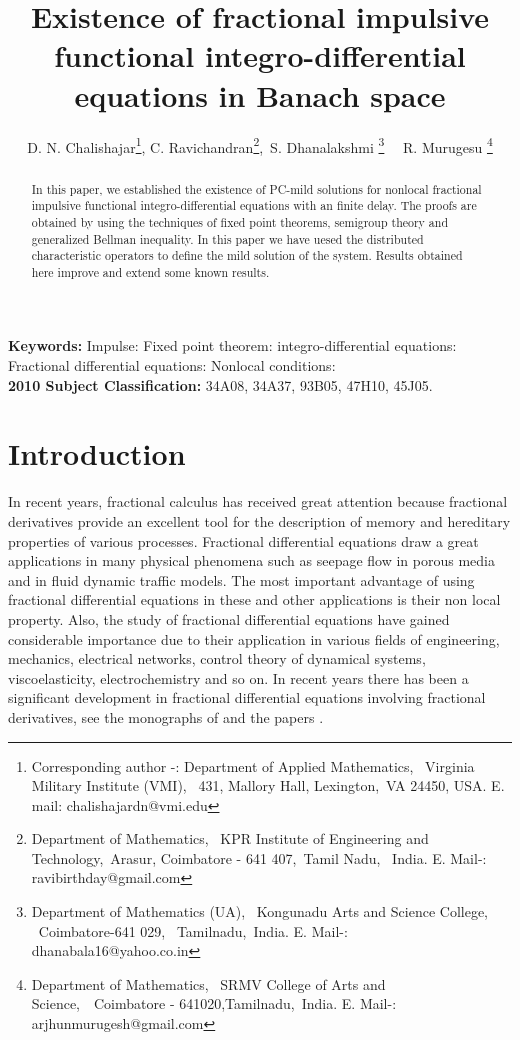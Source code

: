 \documentclass[11pt]{article}
\begin{document}
\setcounter{equation}{0}



\title{\bf Existence of fractional impulsive functional integro-differential equations in Banach space}
\date{}
\author{D. N. Chalishajar\thanks{Corresponding author -: Department of Applied Mathematics, \ Virginia Military Institute (VMI), \ 431, Mallory Hall, Lexington,\  VA 24450, USA. E. mail: chalishajardn@vmi.edu}, C. Ravichandran\thanks{Department of Mathematics, \ KPR Institute of Engineering and Technology,\ Arasur,
Coimbatore - 641 407,\ Tamil Nadu, \ India. E. Mail-: ravibirthday@gmail.com},\, S. Dhanalakshmi \thanks{ Department of Mathematics (UA), \ Kongunadu Arts and Science College, \ Coimbatore-641 029, \ Tamilnadu,\ India. E. Mail-: dhana\textunderscore bala16@yahoo.co.in} \  \ R. Murugesu \thanks{ Department of Mathematics, \ SRMV College of Arts and Science,\  \ Coimbatore - 641020,Tamilnadu,\ India. E. Mail-: arjhunmurugesh@gmail.com}}
\maketitle

\begin{abstract}
In this paper, we established the existence of PC-mild solutions for nonlocal fractional impulsive functional integro-differential equations with an finite delay. The proofs are obtained by using the techniques of fixed point theorems, semigroup theory and generalized Bellman inequality. In this paper we have uesed the distributed characteristic operators to define the mild solution of the system. Results obtained here improve and extend some known results. 
\end{abstract}
{\bf Keywords:} Impulse: Fixed point theorem: integro-differential equations:   Fractional differential equations: Nonlocal conditions:\\
{\bf 2010 Subject Classification:} 34A08, 34A37, 93B05, 47H10, 45J05. \\

 
\section{Introduction}
\quad In recent years, fractional calculus has received great attention because fractional derivatives provide an excellent tool for the description of memory and hereditary properties of various processes. Fractional differential equations draw a great applications in many physical phenomena such as seepage flow in porous media and in fluid dynamic traffic models. The most important advantage of using fractional differential equations in these and other applications is their non local property. Also, the study of fractional differential equations have gained considerable importance due to their application in various fields of engineering, mechanics, electrical networks, control theory of dynamical systems, viscoelasticity, electrochemistry and so on. In recent years there has been a significant development in fractional differential equations involving fractional derivatives, see the monographs of \cite{die,kil,mic,lak,mill,pod,tar,abb,luch} and the papers \cite{chen,dar,mop1,baz,mop2,pan,wan,bale,bal1}. 
\end{document}
